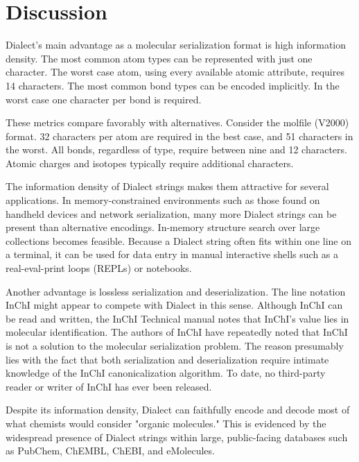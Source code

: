 \documentclass{article}
\begin{document}
\section*{Discussion}

Dialect's main advantage as a molecular serialization format is high information density. The most common atom types can be represented with just one character. The worst case atom, using every available atomic attribute, requires 14 characters. The most common bond types can be encoded implicitly. In the worst case one character per bond is required.

These metrics compare favorably with alternatives. Consider the molfile (V2000) format. 32 characters per atom are required in the best case, and 51 characters in the worst. All bonds, regardless of type, require between nine and 12 characters. Atomic charges and isotopes typically require additional characters.

The information density of Dialect strings makes them attractive for several applications. In memory-constrained environments such as those found on handheld devices and network serialization, many more Dialect strings can be present than alternative encodings. In-memory structure search over large collections becomes feasible. Because a Dialect string often fits within one line on a terminal, it can be used for data entry in manual interactive shells such as a real-eval-print loops (REPLs) or notebooks.

Another advantage is lossless serialization and deserialization. The line notation InChI might appear to compete with Dialect in this sense. Although InChI can be read and written, the InChI Technical manual notes that InChI's value lies in molecular identification. The authors of InChI have repeatedly noted that InChI is not a solution to the molecular serialization problem. The reason presumably lies with the fact that both serialization and deserialization require intimate knowledge of the InChI canonicalization algorithm. To date, no third-party reader or writer of InChI has ever been released.

Despite its information density, Dialect can faithfully encode and decode most of what chemists would consider "organic molecules." This is evidenced by the widespread presence of Dialect strings within large, public-facing databases such as PubChem, ChEMBL, ChEBI, and eMolecules.
\end{document}
